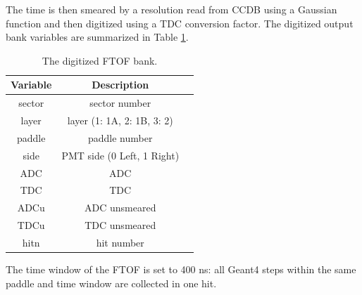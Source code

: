 The time is then smeared by a resolution read from CCDB using a Gaussian function and then digitized using a TDC conversion factor.
The digitized output bank variables are summarized in Table \ref{tab:ftofBank}.

\begin{table}[h]
	\begin{center}
		\begin{tabular}{| c | c | c |}
			\hline \hline
			Variable  & Description                                 \\
			\hline
              sector  &                             sector number   \\
               layer  &               layer (1: 1A, 2: 1B, 3: 2)   \\
              paddle  &                             paddle number   \\
                side  &                PMT side (0 Left, 1 Right)   \\
                 ADC  &                                       ADC   \\
                 TDC  &                                       TDC   \\
                ADCu  &                             ADC unsmeared   \\
                TDCu  &                             TDC unsmeared   \\
                hitn  &                                hit number   \\
			\hline \hline
		\end{tabular}
	\end{center}
	\caption{The digitized FTOF bank.}\label{tab:ftofBank}
\end{table}


The time window  of the FTOF is set to 400 ns: all Geant4 steps within the same paddle and time window are collected in one hit.


